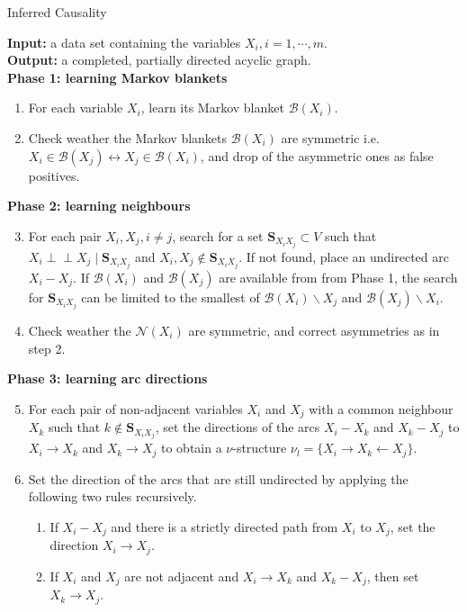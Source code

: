 \begin{algorithm}[H]
\caption{Inferred Causality} \label{icalgo}
\textbf{Input:} a data set containing the variables $X_{i}, i = 1, \cdots, m$.\\
\textbf{Output:} a completed, partially directed acyclic graph.\\
\textbf{Phase 1: learning Markov blankets}
\begin{enumerate}
	\item{For each variable $X_i$, learn its Markov blanket $\mathcal{B}(X_{i})$}.
	\item{Check weather the Markov blankets $\mathcal{B}(X_{i})$ are symmetric i.e. $X_{i} \in \mathcal{B}(X_{j}) \leftrightarrow X_{j} \in \mathcal{B}(X_{i})$, and drop of the asymmetric ones as false positives.}
\end{enumerate}
\textbf{Phase 2: learning neighbours}
\begin{enumerate}
	\setcounter{enumi}{2}
	\item{For each pair $X_{i}, X_{j}, i \neq j$, search for a set $\mathbf{S}_{X_{i}X_{j}} \subset V$ such that  $X_i\perp\!\!\perp X_j\mid \mathbf{S}_{X_{i}X_{j}}$ and $X_{i}, X_{j} \notin \mathbf{S}_{X_{i}X_{j}}$. If not found, place an undirected arc $X_{i} - X_{j}$. If $\mathcal{B}(X_{i})$ and $\mathcal{B}(X_{j})$ are available from from Phase 1, the search for $\mathbf{S}_{X_{i}X_{j}}$ can be limited to the smallest of $\mathcal{B}(X_{i}) \backslash X_{j}$ and $\mathcal{B}(X_{j}) \backslash X_{i}$.}
	\item{Check weather the $\mathcal{N}(X_i)$ are symmetric, and correct asymmetries as in step 2.}
\end{enumerate}
\textbf{Phase 3: learning arc directions}
\begin{enumerate}
	\setcounter{enumi}{4}
	\item{For each pair of non-adjacent variables $X_{i}$ and $X_{j}$ with a common neighbour $X_{k}$ such that $k \notin \mathbf{S}_{X_{i}X_{j}}$, set the directions of the arcs $X_{i} - X_{k}$ and $X_{k} - X_{j}$ to $X_{i} \to X_{k}$ and $X_{k} \to X_{j}$ to obtain a $\nu$-structure $\nu_{l} = \{X_{i} \rightarrow X_{k} \leftarrow X_{j}\}$}.
	\item{Set the direction of the arcs that are still undirected by applying the following two rules recursively.}
	\begin{enumerate}
		\item{If $X_{i} - X_{j}$ and there is a strictly directed path from $X_{i}$ to $X_{j}$, set the direction $X_{i} \to X_{j}$.}
		\item{If $X_{i}$ and $X_{j}$ are not adjacent and $X_{i} \to X_{k}$ and $X_{k} - X_{j}$, then set $X_{k} \to X_{j}$.}
	\end{enumerate}
\end{enumerate}
\end{algorithm}



